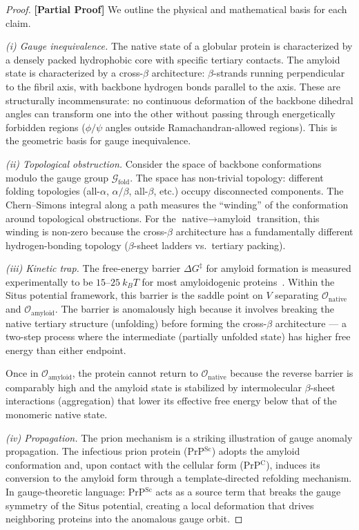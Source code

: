 \documentclass[12pt,a4paper]{article}
\theoremstyle{remark}
\newcommand{\G}{\mathcal{G}}
\newcommand{\rigorPartial}{\textbf{[Partial Proof]}}
\begin{document}
\begin{proof}
\rigorPartial
We outline the physical and mathematical basis for each claim.

\medskip\noindent\textit{(i) Gauge inequivalence.}
The native state of a globular protein is characterized by a densely packed hydrophobic core with specific tertiary contacts.
The amyloid state is characterized by a cross-$\beta$ architecture: $\beta$-strands running perpendicular to the fibril axis, with backbone hydrogen bonds parallel to the axis.
These are structurally incommensurate: no continuous deformation of the backbone dihedral angles can transform one into the other without passing through energetically forbidden regions ($\phi/\psi$ angles outside Ramachandran-allowed regions).
This is the geometric basis for gauge inequivalence.

\medskip\noindent\textit{(ii) Topological obstruction.}
Consider the space of backbone conformations modulo the gauge group $\G_{\text{fold}}$.
The space has non-trivial topology: different folding topologies (all-$\alpha$, $\alpha/\beta$, all-$\beta$, etc.) occupy disconnected components.
The Chern--Simons integral along a path measures the ``winding'' of the conformation around topological obstructions.
For the $\text{native} \to \text{amyloid}$ transition, this winding is non-zero because the cross-$\beta$ architecture has a fundamentally different hydrogen-bonding topology ($\beta$-sheet ladders vs.\ tertiary packing).

\medskip\noindent\textit{(iii) Kinetic trap.}
The free-energy barrier $\Delta G^\ddagger$ for amyloid formation is measured experimentally to be $15$--$25\ k_B T$ for most amyloidogenic proteins~\cite{chiti2017protein}.
Within the Situs potential framework, this barrier is the saddle point on $V$ separating $\mathcal{O}_{\text{native}}$ and $\mathcal{O}_{\text{amyloid}}$.
The barrier is anomalously high because it involves breaking the native tertiary structure (unfolding) before forming the cross-$\beta$ architecture — a two-step process where the intermediate (partially unfolded state) has higher free energy than either endpoint.

Once in $\mathcal{O}_{\text{amyloid}}$, the protein cannot return to $\mathcal{O}_{\text{native}}$ because the reverse barrier is comparably high and the amyloid state is stabilized by intermolecular $\beta$-sheet interactions (aggregation) that lower its effective free energy below that of the monomeric native state.

\medskip\noindent\textit{(iv) Propagation.}
The prion mechanism is a striking illustration of gauge anomaly propagation.
The infectious prion protein (PrP$^{\text{Sc}}$) adopts the amyloid conformation and, upon contact with the cellular form (PrP$^{\text{C}}$), induces its conversion to the amyloid form through a template-directed refolding mechanism.
In gauge-theoretic language: PrP$^{\text{Sc}}$ acts as a source term that breaks the gauge symmetry of the Situs potential, creating a local deformation that drives neighboring proteins into the anomalous gauge orbit.
\end{proof}
\end{document}

